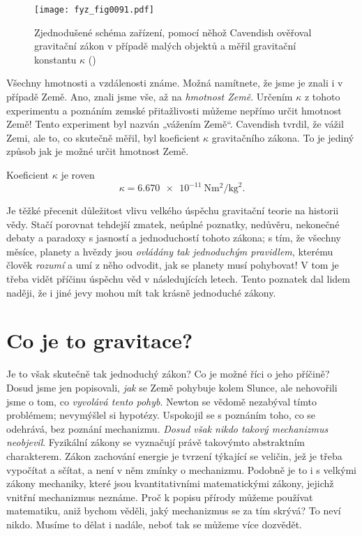     \begin{figure}[ht!]  %
      \centering
      \texttt{[image: fyz\_fig0091.pdf]}
      \caption{Zjednodušené schéma zařízení, pomocí něhož Cavendish ověřoval gravitační zákon v 
               případě malých objektů a měřil gravitační konstantu \(\kappa\)
               (\cite[s.~102]{Feynman01})}
      \label{fyz:fig0091}
    \end{figure}
    Všechny hmotnosti a vzdálenosti známe. Možná namítnete, že jsme je znali i v případě Země. Ano, 
    znali jsme vše, až na \emph{hmotnost Země}. Určením \(\kappa\) z tohoto experimentu a poznáním 
    zemské přitažlivosti můžeme nepřímo určit hmotnost Země! Tento experiment byl nazván „vážením 
    Země“. Cavendish tvrdil, že vážil Zemi, ale to, co skutečně měřil, byl koeficient \(\kappa\) 
    gravitačního zákona. To je jediný způsob jak je možné určit hmotnost Země.
    
    Koeficient \(\kappa\) je roven 
    \begin{equation}\label{fyz:eq095}
      \kappa = \qty{6.670e-11}{\N\square\meter\per\square\kg}.
    \end{equation}
    
    Je těžké přecenit důležitost vlivu velkého úspěchu gravitační teorie na historii vědy. Stačí 
    porovnat tehdejší zmatek, neúplné poznatky, nedůvěru, nekonečné debaty a paradoxy s jasností a 
    jednoduchostí tohoto zákona; s tím, že všechny měsíce, planety a hvězdy jsou \emph{ovládány tak 
    jednoduchým pravidlem}, kterému člověk \emph{rozumí} a umí z něho odvodit, jak se planety musí 
    pohybovat! V tom je třeba vidět příčinu úspěchu věd v následujících letech. Tento poznatek dal 
    lidem naději, že i jiné jevy mohou mít tak krásně jednoduché zákony.
    
  \section{Co je to gravitace?}
    Je to však skutečně tak jednoduchý zákon? Co je možné říci o jeho příčině? Dosud jsme jen 
    popisovali, \emph{jak} se Země pohybuje kolem Slunce, ale nehovořili jsme o tom, co 
    \emph{vyvolává tento pohyb}. Newton se vědomě nezabýval tímto problémem; nevymýšlel si 
    hypotézy. Uspokojil se s poznáním toho, co se odehrává, bez poznání mechanizmu. \emph{Dosud 
    však nikdo takový mechanizmus neobjevil}. Fyzikální zákony se vyznačují právě takovýmto 
    abstraktním charakterem. Zákon zachování energie je tvrzení týkající se veličin, jež je třeba 
    vypočítat a sčítat, a není v něm zmínky o mechanizmu. Podobně je to i s velkými zákony 
    mechaniky, které jsou kvantitativními matematickými zákony, jejichž vnitřní mechanizmus 
    neznáme. Proč k popisu přírody můžeme používat matematiku, aniž bychom věděli, jaký mechanizmus 
    se za tím skrývá? To neví nikdo. Musíme to dělat i nadále, neboť tak se můžeme více dozvědět.
    
